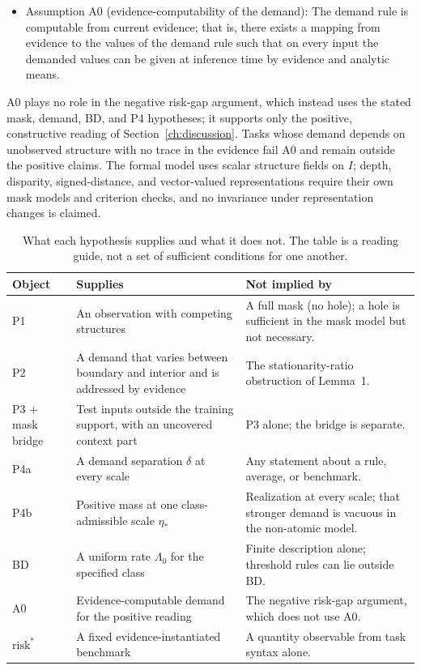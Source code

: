 \documentclass[twoside,11pt]{article}
\begin{document}
\begin{itemize}
\item Assumption A0 (evidence-computability of the demand): The demand rule is computable from current evidence; that is, there exists a mapping from evidence to the values of the demand rule such that on every input the demanded values can be given at inference time by evidence and analytic means.
\end{itemize}

A0 plays no role in the negative risk-gap argument, which instead uses the stated mask, demand, BD, and P4 hypotheses; it supports only the positive, constructive reading of Section~\ref{ch:discussion}. Tasks whose demand depends on unobserved structure with no trace in the evidence fail A0 and remain outside the positive claims. The formal model uses scalar structure fields on $I$; depth, disparity, signed-distance, and vector-valued representations require their own mask models and criterion checks, and no invariance under representation changes is claimed.

\begin{table}[t]
\caption{What each hypothesis supplies and what it does not. The table is a reading guide, not a set of sufficient conditions for one another.}
\label{tab:assumptions}
\centering
\small
\begin{tabular}{@{}>{\raggedright\arraybackslash}p{}>{\raggedright\arraybackslash}p{}>{\raggedright\arraybackslash}p{}@{}}
\hline
\textbf{Object} & \textbf{Supplies} & \textbf{Not implied by}\\
\hline
P1 & An observation with competing structures & A full mask (no hole); a hole is sufficient in the mask model but not necessary.\\
P2 & A demand that varies between boundary and interior and is addressed by evidence & The stationarity-ratio obstruction of Lemma~1.\\
P3 + mask bridge & Test inputs outside the training support, with an uncovered context part & P3 alone; the bridge is separate.\\
P4a & A demand separation $\delta$ at every scale & Any statement about a rule, average, or benchmark.\\
P4b & Positive mass at one class-admissible scale $\eta_*$ & Realization at every scale; that stronger demand is vacuous in the non-atomic model.\\
BD & A uniform rate $\Lambda_0$ for the specified class & Finite description alone; threshold rules can lie outside BD.\\
A0 & Evidence-computable demand for the positive reading & The negative risk-gap argument, which does not use A0.\\
$\mathrm{risk}^*$ & A fixed evidence-instantiated benchmark & A quantity observable from task syntax alone.\\
\hline
\end{tabular}
\end{table}
\end{document}
